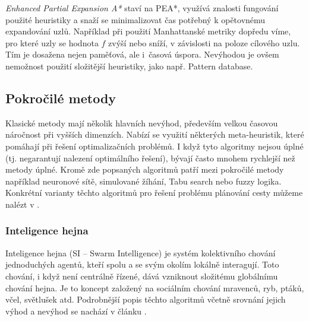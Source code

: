 \emph{Enhanced Partial Expansion A*} staví na PEA*, využívá znalosti fungování použité heuristiky a snaží se minimalizovat čas potřebný k opětovnému expandování uzlů. Například při použití Manhattanské metriky dopředu víme, pro které uzly se hodnota $f$ zvýší nebo sníží, v závislosti na poloze cílového uzlu. Tím je dosažena nejen paměťová, ale i~časová úspora. Nevýhodou je ovšem nemožnost použití složitější heuristiky, jako např. Pattern database.

 

\subsection{Pokročilé metody}
Klasické metody mají několik hlavních nevýhod, především velkou časovou náročnost při vyšších dimenzích. Nabízí se využití některých meta-heuristik, které pomáhají při řešení optimalizačních problémů. I když tyto algoritmy nejsou úplné (tj. negarantují nalezení optimálního řešení), bývají často mnohem rychlejší než metody úplné. Kromě zde popsaných algoritmů patří mezi pokročilé metody například neuronové sítě, simulované žíhání, Tabu search nebo fuzzy logika. Konkrétní varianty těchto algoritmů pro řešení problému plánování cesty můžeme nalézt v \cite{Masehian2007}.


\subsubsection{Inteligence hejna}
Inteligence hejna (SI -- Swarm Intelligence) je systém kolektivního chování jednoduchých agentů, kteří spolu a se svým okolím lokálně interagují. Toto chování, i když není centrálně řízené, dává vzniknout složitému globálnímu chování hejna. Je to koncept založený na sociálním chování mravenců, ryb, ptáků, včel, světlušek atd. Podrobnější popis těchto algoritmů včetně srovnání jejich výhod a nevýhod se nachází v článku \cite{SinghPal20131218}.

